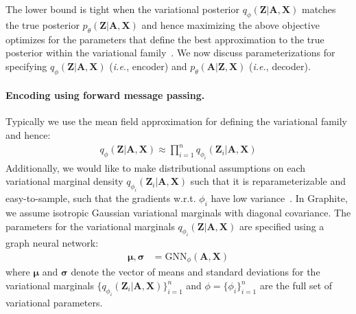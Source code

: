 \documentclass{article}
\newcommand{\name}{Graphite}
\begin{document}
The lower bound is tight when the variational posterior $q_\phi(\mathbf{Z}\vert \mathbf{A}, \mathbf{X})$ matches the true posterior $p_\theta(\mathbf{Z} \vert \mathbf{A}, \mathbf{X})$ and hence maximizing the above objective optimizes for the parameters that define the best approximation to the true posterior within the variational family~\citep{blei2017variational}.
We now discuss parameterizations for specifying  $q_\phi(\mathbf{Z}\vert \mathbf{A}, \mathbf{X})$ (\textit{i.e.}, encoder) and $p_\theta(\mathbf{A} \vert \mathbf{Z}, \mathbf{X})$ (\textit{i.e.}, decoder).


\paragraph{Encoding using forward message passing.}

Typically we use the mean field approximation for defining the variational family and hence:
\begin{align}\label{eq:enc_mf}
q_\phi(\mathbf{Z} \vert \mathbf{A}, \mathbf{X}) \approx \prod_{i=1}^n q_{\phi_i}(\mathbf{Z}_i \vert \mathbf{A}, \mathbf{X})
\end{align}
Additionally, we would like to make distributional assumptions on each variational marginal density $q_{\phi_i}(\mathbf{Z}_i\vert \mathbf{A}, \mathbf{X})$ such that it is reparameterizable and easy-to-sample, such that the gradients w.r.t. $\phi_i$ have low variance~\citep{kingma2013auto}. In \name{}, we assume isotropic Gaussian variational marginals with diagonal covariance.
The parameters for the variational marginals $q_{\phi_i}(\mathbf{Z}\vert \mathbf{A}, \mathbf{X})$ are specified using a graph neural network: 
\begin{align}\label{eq:graphite_enc}
\boldsymbol{\mu}, \boldsymbol{\sigma} &= \mathrm{GNN}_{\phi}(\mathbf{A}, \mathbf{X})
\end{align}
where $\boldsymbol{\mu}$ and $\boldsymbol{\sigma}$ denote the vector of means and standard deviations for the variational marginals $\{q_{\phi_i}(\mathbf{Z}_i\vert \mathbf{A}, \mathbf{X})\}_{i=1}^n$ and $\phi=\{\phi_i\}_{i=1}^n$ are the full set of variational parameters.
\end{document}
